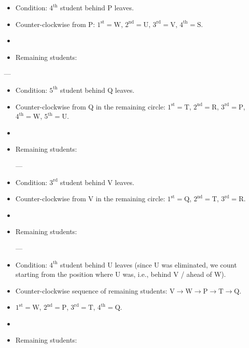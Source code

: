 \begin{enumerate}[label=\thesubsection.\arabic*, ref=\thesubsection.\theenumi]
\begin{itemize}
    \item Condition: $4^{\text{th}}$ student behind P leaves.
    \item Counter-clockwise from P: $1^{\text{st}} = \text{W}$, $2^{\text{nd}} = \text{U}$, $3^{\text{rd}} = \text{V}$, $4^{\text{th}} = \text{S}$.
    \item {}
    \item Remaining students: 
\end{itemize}

---

\begin{itemize}
    \item Condition: $5^{\text{th}}$ student behind Q leaves.
    \item Counter-clockwise from Q in the remaining circle: $1^{\text{st}} = \text{T}$, $2^{\text{nd}} = \text{R}$, $3^{\text{rd}} = \text{P}$, $4^{\text{th}} = \text{W}$, $5^{\text{th}} = \text{U}$.
    \item {}
    \item Remaining students: 


---


    \item Condition: $3^{\text{rd}}$ student behind V leaves.
    \item Counter-clockwise from V in the remaining circle: $1^{\text{st}} = \text{Q}$, $2^{\text{nd}} = \text{T}$, $3^{\text{rd}} = \text{R}$.
    \item {}
    \item Remaining students: 


---


    \item Condition: $4^{\text{th}}$ student behind U leaves (since U was eliminated, we count starting from the position where U was, i.e., behind V / ahead of W).
    \item Counter-clockwise sequence of remaining students: $\text{V} \to \text{W} \to \text{P} \to \text{T} \to \text{Q}$.
    \item $1^{\text{st}} = \text{W}$, $2^{\text{nd}} = \text{P}$, $3^{\text{rd}} = \text{T}$, $4^{\text{th}} = \text{Q}$.
    \item {}
    \item Remaining students: 
\end{itemize}


\end{enumerate}
